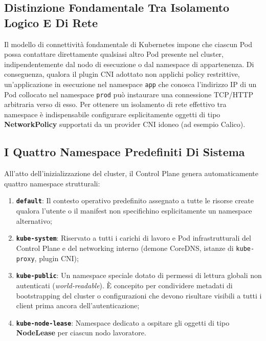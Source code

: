 \documentclass[11pt, a4paper]{article}
\begin{document}
\subsection{Distinzione Fondamentale Tra Isolamento Logico E Di Rete}
\begin{center}
\end{center}

Il modello di connettività fondamentale di Kubernetes impone che ciascun Pod possa contattare direttamente qualsiasi altro Pod presente nel cluster, indipendentemente dal nodo di esecuzione o dal namespace di appartenenza. Di conseguenza, qualora il plugin CNI adottato non applichi policy restrittive, un'applicazione in esecuzione nel namespace \texttt{app} che conosca l'indirizzo IP di un Pod collocato nel namespace \texttt{prod} può instaurare una connessione TCP/HTTP arbitraria verso di esso. Per ottenere un isolamento di rete effettivo tra namespace è indispensabile configurare esplicitamente oggetti di tipo \textbf{NetworkPolicy} supportati da un provider CNI idoneo (ad esempio Calico).

\subsection{I Quattro Namespace Predefiniti Di Sistema}
All'atto dell'inizializzazione del cluster, il Control Plane genera automaticamente quattro namespace strutturali:

\begin{enumerate}[noitemsep]
    \item \textbf{\texttt{default}}: Il contesto operativo predefinito assegnato a tutte le risorse create qualora l'utente o il manifest non specifichino esplicitamente un namespace alternativo;
    \item \textbf{\texttt{kube-system}}: Riservato a tutti i carichi di lavoro e Pod infrastrutturali del Control Plane e del networking interno (demone CoreDNS, istanze di \texttt{kube-proxy}, plugin CNI);
    \item \textbf{\texttt{kube-public}}: Un namespace speciale dotato di permessi di lettura globali non autenticati (\emph{world-readable}). È concepito per condividere metadati di bootstrapping del cluster o configurazioni che devono risultare visibili a tutti i client prima ancora dell'autenticazione;
    \item \textbf{\texttt{kube-node-lease}}: Namespace dedicato a ospitare gli oggetti di tipo \textbf{NodeLease} per ciascun nodo lavoratore.
\end{enumerate}
\end{document}
